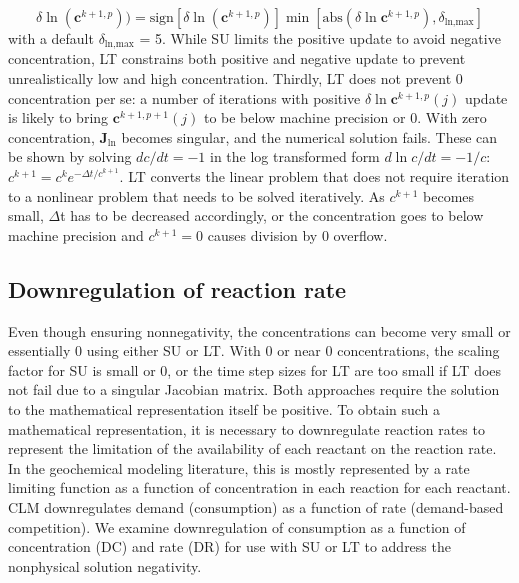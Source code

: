 \documentclass[gmd, manuscript]{copernicus}
\begin{document}
\begin{equation}
\delta \ln(\mathbf{c}^{k+1,p}))=\text{sign}[\delta
\ln(\mathbf{c}^{k+1,p})]\min[\text{abs}(\delta \ln
\mathbf{c}^{k+1,p}),\delta_\text{ln,max}]
\end{equation}
with a default $\delta_\text{ln,max}$ = 5. While SU limits the positive update
to avoid negative concentration, LT constrains both positive and negative
update to prevent unrealistically low and high concentration. Thirdly, LT does
not prevent 0
concentration per se: a number of iterations with positive $\delta \ln
\mathbf{c}^{k+1,p} (j)$ update is likely to bring $\mathbf{c}^{k+1,p+1} (j)$ to
be below machine precision or 0. With zero concentration,
$\mathbf{J}_\text{ln}$ becomes singular, and the numerical solution fails.
These can be shown by solving $dc/dt=-1$ in the log transformed form $d\ln
c/dt=-1/c$: $c^{k+1}=c^k e^{-\Delta t/c^{k+1}}$. LT
converts the linear problem that does not require iteration to a nonlinear
problem that needs to be solved iteratively.
As $c^{k+1}$ becomes small, $\Delta$t has to be decreased accordingly, or the
concentration goes to below machine precision and $c^{k+1}=0$ causes division
by 0 overflow. 

\subsection{Downregulation of reaction rate}
Even though ensuring nonnegativity, the concentrations can become very small or
essentially 0 using either SU or LT. With 0 or near 0 concentrations, the
scaling factor for SU is small or 0, or the time step sizes for LT are too
small if LT does not fail due to a singular Jacobian matrix. Both approaches
require the solution to the mathematical representation itself be
positive. To obtain such a mathematical representation, it is necessary to
downregulate reaction rates to represent the limitation of the availability of
each reactant on the reaction rate.  In the geochemical modeling literature,
this is mostly represented by a rate limiting function as a function of
concentration in each reaction for each reactant. CLM downregulates demand
(consumption) as a function of rate (demand-based competition). We examine
downregulation of consumption as a function of concentration (DC) and rate (DR)
for use with SU or LT to address the nonphysical solution negativity.
\end{document}
